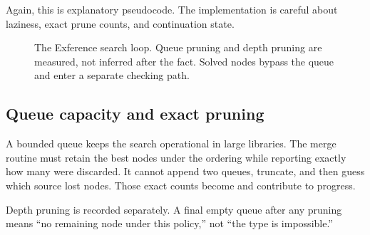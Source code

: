 \documentclass[10pt,letterpaper,oneside]{report}
\newcommand{\code}[1]{\texttt{\detokenize{#1}}}
\begin{document}
Again, this is explanatory pseudocode. The implementation is careful about laziness, exact prune counts, and continuation state.

\begin{figure}[htbp]
\centering
{}
\caption{The Exference search loop. Queue pruning and depth pruning are measured, not inferred after the fact. Solved nodes bypass the queue and enter a separate checking path.}
\label{fig:exference-loop}
\end{figure}

\subsection{Queue capacity and exact pruning}

A bounded queue keeps the search operational in large libraries. The merge routine must retain the best nodes under the ordering while reporting exactly how many were discarded. It cannot append two queues, truncate, and then guess which source lost nodes. Those exact counts become \code{QueueLimitPruned} and contribute to progress.

Depth pruning is recorded separately. A final empty queue after any pruning means ``no remaining node under this policy,'' not ``the type is impossible.''
\end{document}
